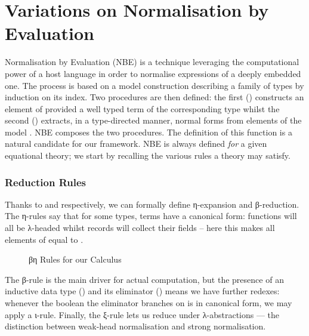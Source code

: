 \chapter{Variations on Normalisation by Evaluation}

Normalisation by Evaluation (NBE) is a technique leveraging the computational
power of a host language in order to normalise expressions of a deeply
embedded one. The process is based on a model construction describing a
family of types by induction on its  index. Two
procedures are then defined: the first () constructs an element
of    provided a well typed term of the corresponding
   type whilst the second () extracts, in
a type-directed manner, normal forms    from elements
of the model   . NBE composes the two procedures. The
definition of this  function is a natural candidate for our
 framework. NBE is always defined \emph{for} a
given equational theory; we start by recalling the various
rules a theory may satisfy.

\subsection{Reduction Rules}

Thanks to  and  respectively, we can formally
define η-expansion and β-reduction. The η-rules say that for some types,
terms have a canonical form: functions will all be λ-headed whilst records will
collect their fields -- here this makes all elements of \AIC{\unit{}} equal to .


\begin{figure}[h]
\caption{βη Rules for our Calculus\label{fig:betaetarules}}
\end{figure}

The β-rule is the main driver for actual computation,
but the presence of an inductive data type () and its eliminator
() means we have further redexes: whenever the
boolean the eliminator branches on is in canonical form, we may apply
a ι-rule. Finally, the ξ-rule lets us reduce under
λ-abstractions --- the distinction between weak-head normalisation and
strong normalisation.

